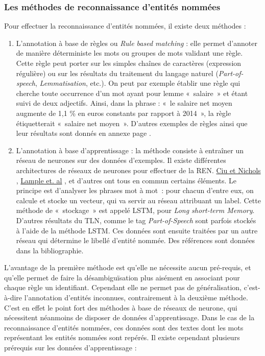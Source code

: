 \subsubsection*{Les méthodes de reconnaissance d'entités nommées}
Pour effectuer la reconnaissance d'entités nommées, il existe deux méthodes : 
\begin{enumerate}
    \item L'annotation à base de règles ou \textit{Rule based matching} : elle permet d'annoter de manière déterministe les mots ou groupes de mots validant une règle. Cette règle peut porter sur les simples chaînes de caractères (expression régulière) ou sur les résultats du traitement du langage naturel (\textit{Part-of-speech}, \textit{Lemmatisation}, etc.). On peut par exemple établir une règle qui cherche toute occurrence d'un mot ayant pour lemme «~salaire~» et étant suivi de deux adjectifs. Ainsi, dans la phrase : «~le salaire net moyen augmente de 1,1 \% en euros constants par rapport à 2014~», la règle étiquetterait «~salaire net moyen~». D'autres exemples de règles ainsi que leur résultats sont donnés en annexe page \pageref{rule-exemple}.
    \vspace{5pt}
    \item L'annotation à base d'apprentissage : la méthode consiste à entraîner un réseau de neurones sur des données d'exemples. Il existe différentes architectures de réseaux de neurones pour effectuer de la REN. \href{https://www.aclweb.org/anthology/Q16-1026}{Ciu et Nichols} \cite{chiu-nichols}, \href{https://www.aclweb.org/anthology/N16-1030}{Lample et. al} \cite{lampe-al}, et d'autres ont tous en commun certains éléments. Le principe est d'analyser les phrases mot à mot~: pour chacun d'entre eux, on calcule et stocke un vecteur, qui va servir au réseau attribuant un label. Cette méthode de «~stockage~» est appelé LSTM, pour \textit{Long short-term Memory}. D'autres résultats du TLN, comme le tag \textit{Part-of-Speech} sont parfois stockés à l'aide de la méthode LSTM. Ces données sont ensuite traitées par un autre réseau qui détermine le libellé d'entité nommée. Des références sont données dans la bibliographie.
    \newline
\end{enumerate}

L'avantage de la première méthode est qu'elle ne nécessite aucun pré-requis, et qu'elle permet de faire la désambiguïsation plus aisément en associant pour chaque règle un identifiant. Cependant elle ne permet pas de généralisation, c'est-à-dire l'annotation d'entités inconnues, contrairement à la deuxième méthode. C'est en effet le point fort des méthodes à base de réseaux de neurone, qui nécessitent néanmoins de disposer de données d'apprentissage. Dans le cas de la reconnaissance d'entités nommées, ces données sont des textes dont les mots représentant les entités nommées sont repérés. Il existe cependant plusieurs prérequis sur les données d'apprentissage :
\newline

